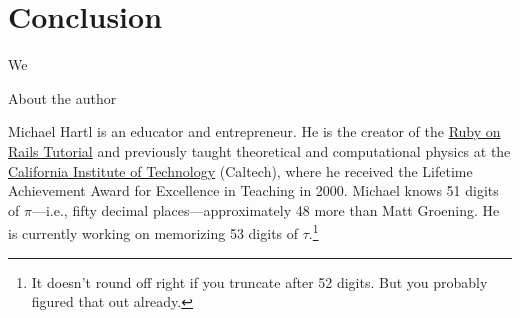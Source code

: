 \documentclass{article}
\begin{document}
\section{Conclusion}

We

About the author

Michael Hartl is an educator and entrepreneur. He is the creator of the  \href{http://www.railstutorial.org/}{Ruby on Rails Tutorial} and previously taught theoretical and computational physics at the \href{http://www.caltech.edu/}{California Institute of Technology} (Caltech), where he received the Lifetime Achievement Award for Excellence in Teaching in 2000. Michael knows 51 digits of $\pi$---i.e., fifty decimal places---approximately 48 more than Matt Groening. He is currently working on memorizing 53 digits of $\tau$.\footnote{It doesn't round off right if you truncate after 52 digits. But you probably figured that out already.}
\end{document}
